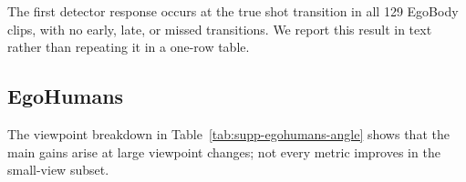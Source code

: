 \begin{table}[t]
  \centering
  \caption{Local reconstruction and temporal stability on EgoBody. Human
  errors and acceleration are in mm, ATE-Sim3 in m, and foot sliding in cm.}
  \label{tab:supp-egobody-local}
  \small
  \resizebox{0.86\textwidth}{!}{}
\end{table}

\begin{table}[t]
  \centering
  \caption{Camera and human continuity at EgoBody shot transitions.
  Translation and root errors are in m; rotation errors are in degrees.}
  \label{tab:supp-egobody-boundary}
  \small
  \resizebox{0.88\textwidth}{!}{}
\end{table}

\begin{table}[t]
  \centering
  \caption{EgoBody results by viewpoint change. W/WA are in mm and camera
  error is in m.}
  \label{tab:supp-egobody-angle}
  \small
  
\end{table}

The first detector response occurs at the true shot transition in all 129
EgoBody clips, with no early, late, or missed transitions. We report this
result in text rather than repeating it in a one-row table.

\FloatBarrier
\subsection{EgoHumans}
\label{app:egohumans-details}

The viewpoint breakdown in Table~\ref{tab:supp-egohumans-angle} shows that the
main gains arise at large viewpoint changes; not every metric improves in the
small-view subset.

\begin{table}[t]
  \centering
  \caption{EgoHumans results by viewpoint change. W/WA are in mm.}
  \label{tab:supp-egohumans-angle}
  \scriptsize
  
\end{table}

